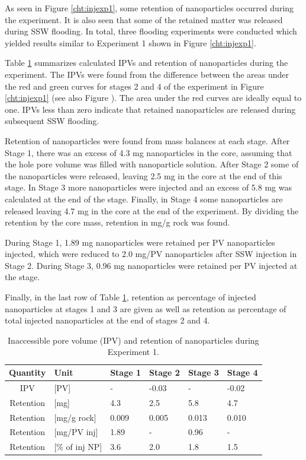 As seen in Figure \ref{cht:injexp1}, some retention of nanoparticles occurred during the experiment. It is also seen that some of the retained matter was released during SSW flooding. In total, three flooding experiments were conducted which yielded results similar to Experiment 1 shown in Figure \ref{cht:injexp1}.

Table \ref{tab:ipvexp1} summarizes calculated IPVs and retention of nanoparticles during the experiment. The IPVs were found from the difference between the areas under the red and green curves for stages 2 and 4 of the experiment in Figure \ref{cht:injexp1} (see also Figure ). The area under the red curves are ideally equal to one. IPVs less than zero indicate that retained nanoparticles are released during subsequent SSW flooding.

Retention of nanoparticles were found from mass balances at each stage. After Stage 1, there was an excess of 4.3 mg nanoparticles in the core, assuming that the hole pore volume was filled with nanoparticle solution. After Stage 2 some of the nanoparticles were released, leaving 2.5 mg in the core at the end of this stage. In Stage 3 more nanoparticles were injected and an excess of 5.8 mg was calculated at the end of the stage. Finally, in Stage 4 some nanoparticles are released leaving 4.7 mg in the core at the end of the experiment. By dividing the retention by the core mass, retention in mg/g rock was found.

During Stage 1, 1.89 mg nanoparticles were retained per PV nanoparticles injected, which were reduced to 2.0 mg/PV nanoparticles after SSW injection in Stage 2. During Stage 3, 0.96 mg nanoparticles were retained per PV injected at the stage. 

Finally, in the last row of Table \ref{tab:ipvexp1}, retention as percentage of injected nanoparticles at stages 1 and 3 are given as well as retention as percentage of total injected nanoparticles at the end of stages 2 and 4. 

\begin{table} 
\small
\centering
\caption{Inaccessible pore volume (IPV) and retention of nanoparticles during Experiment 1.}
\label{tab:ipvexp1}
\begin{tabular}{c l l l l l } 
\toprule
\textbf{Quantity} & \textbf{Unit} & \textbf{Stage 1} & \textbf{Stage 2} & \textbf{Stage 3} & \textbf{Stage 4} \\ 
\midrule 
IPV         & [PV]          & -         & -0.03     & -         & -0.02     \\
Retention   & [mg]          & 4.3       & 2.5       & 5.8       & 4.7       \\ 
Retention   & [mg/g rock]   & 0.009     & 0.005     & 0.013     & 0.010     \\ 
Retention   & [mg/PV inj]   & 1.89      & -         & 0.96      & -         \\
Retention   & [\% of inj NP]& 3.6       & 2.0       & 1.8       & 1.5       \\ 
\bottomrule
\end{tabular}
\end{table}

